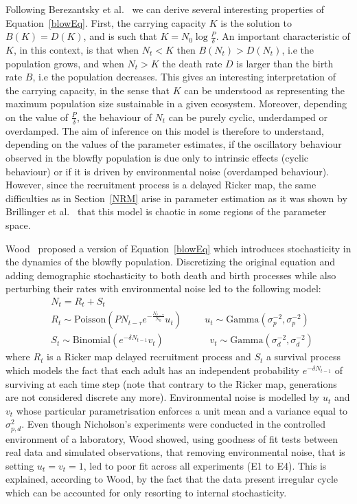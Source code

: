 \documentclass[12pt]{article}
\begin{document}
	Following Berezantsky et al.~\cite{berezansky2010nicholson} we can derive several interesting properties of Equation~\ref{blowEq}. First, the carrying capacity $K$ is the solution to $B(K)=D(K)$, and is such that $K=N_0\log\frac{P}{\delta}$. An important characteristic of $K$, in this context, is that when $N_t < K$ then $B(N_t) > D(N_t)$, i.e the population grows, and when $N_t > K$ the death rate $D$ is larger than the birth rate $B$, i.e the population decreases. This gives an interesting interpretation of the carrying capacity, in the sense that $K$ can be understood as representing the maximum population size sustainable in a given ecosystem. Moreover, depending on the value of $\frac{P}{\delta}$, the behaviour of $N_t$ can be purely cyclic, underdamped or overdamped. The aim of inference on this model is therefore to understand, depending on the values of the parameter estimates, if the oscillatory behaviour observed in the blowfly population is due only to intrinsic effects (cyclic behaviour) or if it is driven by environmental noise (overdamped behaviour). However, since the recruitment process is a delayed Ricker map, the same difficulties  as in Section~\ref{NRM} arise in parameter estimation as it was shown by Brillinger et al.~\cite{brillinger1980empirical} that this model is chaotic in some regions of the parameter space.
	
	Wood~\cite{wood2010statistical} proposed a version of Equation~\ref{blowEq} which introduces stochasticity in the dynamics of the blowfly population. Discretizing the original equation and adding demographic stochasticity to both death and birth processes while also perturbing their rates with environmental noise led to the following model:
	\begin{align}
	& N_t = R_t + S_t \\
	& R_t \sim  \mathrm{Poisson}(PN_{t-\tau}e^{-\frac{N_{t-\tau}}{N_0}}u_t)  \hspace{1cm} u_t \sim \mathrm{Gamma}(\sigma_p^{-2}, \sigma_p^{-2})\\ 
	& S_t \sim \mathrm{Binomial}(e^{-\delta N_{t-1}}v_t) \hspace{2cm}  v_t \sim \mathrm{Gamma}(\sigma_d^{-2}, \sigma_d^{-2}) 
	\end{align}
	where $R_t$ is a Ricker map delayed recruitment process and $S_t$ a survival process which models the fact that each adult has
	an independent probability $e^{-\delta N_{t-1}}$ of surviving at each time step (note that contrary to the Ricker map, generations are not considered discrete any more). Environmental noise is modelled by $u_t$ and $v_t$ whose particular parametrisation enforces a unit mean and a variance equal to $\sigma_{p,d}^2$. Even though Nicholson's experiments were conducted in the controlled environment of a laboratory, Wood showed, using goodness of fit tests between real data and simulated observations, that removing environmental noise, that is setting $u_t=v_t=1$, led to poor fit across all experiments (E1 to E4). This is explained, according to Wood, by the fact that the data present irregular cycle which can be accounted for only resorting to internal stochasticity.
\end{document}
